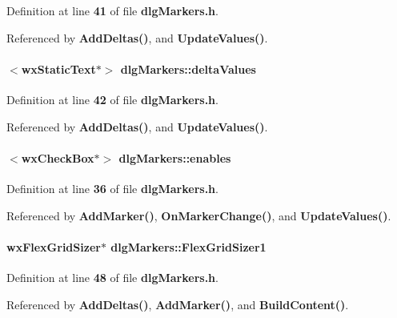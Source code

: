 Definition at line {\bf 41} of file {\bf dlg\+Markers.\+h}.



Referenced by {\bf Add\+Deltas()}, and {\bf Update\+Values()}.

\paragraph[{delta\+Values}]{$<$wx\+Static\+Text$\ast$$>$ dlg\+Markers\+::delta\+Values}\label{classdlgMarkers_a2b4467ea44fe025a726d4b1120561e78}


Definition at line {\bf 42} of file {\bf dlg\+Markers.\+h}.



Referenced by {\bf Add\+Deltas()}, and {\bf Update\+Values()}.

\paragraph[{enables}]{$<$wx\+Check\+Box$\ast$$>$ dlg\+Markers\+::enables}\label{classdlgMarkers_afd8db62502c9c9282f3708db6e1a46df}


Definition at line {\bf 36} of file {\bf dlg\+Markers.\+h}.



Referenced by {\bf Add\+Marker()}, {\bf On\+Marker\+Change()}, and {\bf Update\+Values()}.

\paragraph[{Flex\+Grid\+Sizer1}]{\setlength{\rightskip}{0pt plus 5cm}wx\+Flex\+Grid\+Sizer$\ast$ dlg\+Markers\+::\+Flex\+Grid\+Sizer1}\label{classdlgMarkers_a843c94b60b1adaee328a200fb74517bd}


Definition at line {\bf 48} of file {\bf dlg\+Markers.\+h}.



Referenced by {\bf Add\+Deltas()}, {\bf Add\+Marker()}, and {\bf Build\+Content()}.

